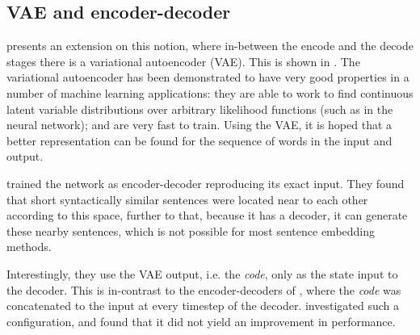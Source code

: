 \documentclass[12pt,parskip]{komatufte}
\begin{document}
\subsection{VAE and encoder-decoder}\label{sec:vae-and-encoder-decoder}
 presents an extension on this notion,
where in-between the encode and the decode stages there is a variational autoencoder (VAE).
This is shown in .
The variational autoencoder  has been demonstrated to have very good properties in a number of machine learning applications: they are able to work to find continuous latent variable distributions over arbitrary likelihood functions (such as in the neural network); and are very fast to train.
Using the VAE, it is hoped that a better representation can be found for the sequence of words in the input and output.


\textcite{Bowman2015SmoothGeneration} trained the network as encoder-decoder reproducing its exact input.
They found that short syntactically similar sentences were located near to each other according to this space,
further to that, because it has a decoder, it can generate these nearby sentences,
which is not possible for most sentence embedding methods.

Interestingly, they use the VAE output, i.e. the \emph{code}, only as the state input to the decoder.
This is in-contrast to the encoder-decoders of \textcite{cho-EtAl:2014:EMNLP2014},
where the \emph{code} was concatenated to the input at every timestep of the decoder.
\textcite{Bowman2015SmoothGeneration} investigated such a configuration,
and found that it did not yield an improvement in performance.
\end{document}
